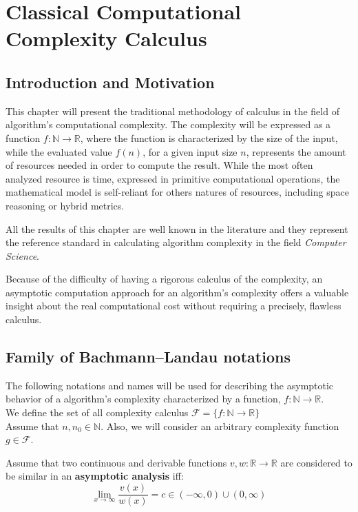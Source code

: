\chapter{Classical Computational Complexity Calculus }


\section{Introduction and Motivation}
This chapter will present the traditional methodology of calculus in the field of algorithm's computational complexity. The complexity will be expressed as a function $f:\mathbb{N}\longrightarrow\mathbb{R}$, where the function is characterized by the size of the input, while the evaluated value $f(n)$, for a given input size $n$, represents the amount of resources needed in order to compute the result. While the most often analyzed resource is time, expressed in primitive computational operations, the mathematical model is self-reliant for others natures of resources, including space reasoning or hybrid metrics.

All the results of this chapter are well known in the literature and they represent the reference standard in calculating algorithm complexity in the field \textit{Computer Science}.

Because of the difficulty of having a rigorous calculus of the complexity, an asymptotic computation approach for an algorithm's complexity offers a valuable insight about the real computational cost without requiring a precisely, flawless calculus.


\section{Family of Bachmann–Landau notations}
The following notations and names will be used for describing the asymptotic behavior of a algorithm's complexity characterized by a function, $f:\mathbb{N}\longrightarrow\mathbb{R}$. \\
We define the set of all complexity calculus $\mathcal{F}= \lbrace f:\mathbb{N}\longrightarrow\mathbb{R} \rbrace$
\\Assume that $n, n_{0}\in\mathbb{N}$. Also, we will consider an arbitrary complexity function $g \in \mathcal{F}$. \\

\begin{definition}
    Assume that two continuous and derivable functions $v,w:\mathbb{R}\longrightarrow\mathbb{R}$ are considered to be similar in an \textbf{asymptotic analysis} iff:
    \[\lim_{x\to\infty} \frac{v(x)}{w(x)} = c \in (-\infty, 0) \cup (0,\infty) \]
\end{definition}

